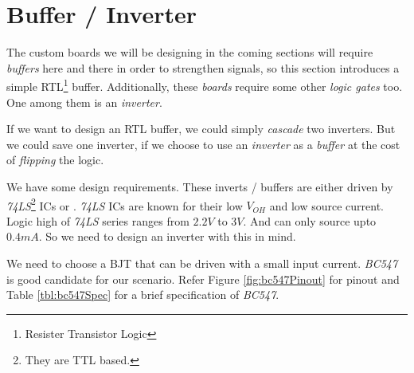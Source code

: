 \documentclass[../../main]{subfiles}
\begin{document}
\section{Buffer / Inverter} \label{sec:bufferOrInverter}

The custom boards we will be designing in the coming sections will require \emph{buffers}
here and there in order to strengthen signals, so this section introduces a simple
RTL\footnote{Resister Transistor Logic} buffer. Additionally, these \emph{boards} require
some other \emph{logic gates} too. One among them is an \emph{inverter}.

If we want to design an RTL buffer, we could simply \emph{cascade} two inverters. But we
could save one inverter, if we choose to use an \emph{inverter} as a \emph{buffer} at
the cost of \emph{flipping} the logic.


We have some design requirements. These inverts / buffers are either driven by
\emph{74LS}\footnote{They are TTL based.} ICs or \esp. \emph{74LS} ICs are known
for their low $\si{V}_{OH}$ and low source current. Logic high of \emph{74LS} series ranges
from $2.2\si{V}$ to $3\si{V}$. And can only source upto $0.4\si{mA}$. So we need to
design an inverter with this in mind.

We need to choose a BJT that can be driven with a small input current. \emph{BC547} is
good candidate for our scenario. Refer Figure \ref{fig:bc547Pinout} for pinout and Table
\ref{tbl:bc547Spec} for a brief specification of \emph{BC547}.
\end{document}
